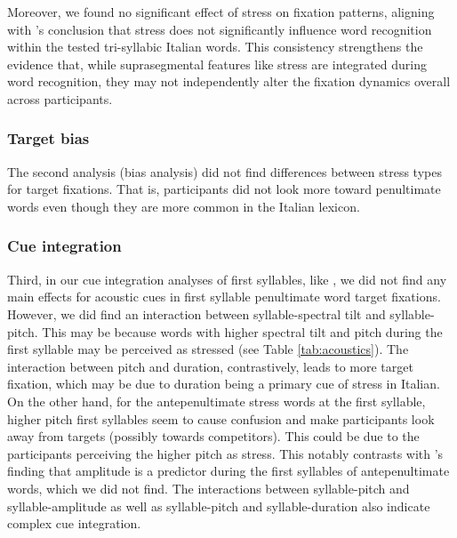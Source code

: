 Moreover, we found no significant effect of stress on fixation patterns, aligning with \cite{Sulpizio_McQueen_2012}'s conclusion that stress does not significantly influence word recognition within the tested tri-syllabic Italian words. This consistency strengthens the evidence that, while suprasegmental features like stress are integrated during word recognition, they may not independently alter the fixation dynamics overall across participants.

\subsubsection{Target bias}

The second analysis (bias analysis) did not find differences between stress types for target fixations. That is, participants did not look more toward penultimate words even though they are more common in the Italian lexicon. 

\subsubsection{Cue integration}

Third, in our cue integration analyses of first syllables, like \cite{Sulpizio_McQueen_2012}, we did not find any main effects for acoustic cues in first syllable penultimate word target fixations. However, we did find an interaction between syllable-spectral tilt and syllable-pitch. This may be because words with higher spectral tilt and pitch during the first syllable may be perceived as stressed (see Table \ref{tab:acoustics}). The interaction between pitch and duration, contrastively, leads to more target fixation, which may be due to duration being a primary cue of stress in Italian. On the other hand, for the antepenultimate stress words at the first syllable, higher pitch first syllables seem to cause confusion and make participants look away from targets (possibly towards competitors). This could be due to the participants perceiving the higher pitch as stress. This notably contrasts with \cite{Sulpizio_McQueen_2012}'s finding that amplitude is a predictor during the first syllables of antepenultimate words, which we did not find. The interactions between syllable-pitch and syllable-amplitude as well as syllable-pitch and syllable-duration also indicate complex cue integration.


